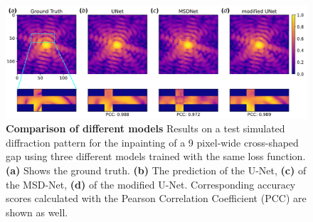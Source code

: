 \begin{figure}[h]
    \includegraphics[width=\textwidth]{figures/Inpainting/model_comparison.pdf}
    \caption{\textbf{Comparison of different models} Results on a test simulated diffraction pattern for the inpainting 
    of a 9 pixel-wide cross-shaped gap using three different models trained with the same loss function.
    \textbf{(a)} Shows the ground truth. \textbf{(b)} The prediction of the U-Net, \textbf{(c)} 
     of the MSD-Net, \textbf{(d)} of the modified U-Net. Corresponding accuracy scores calculated with the Pearson Correlation 
    Coefficient (PCC) are shown as well.}
    \label{fig:models_comparison}
\end{figure}


